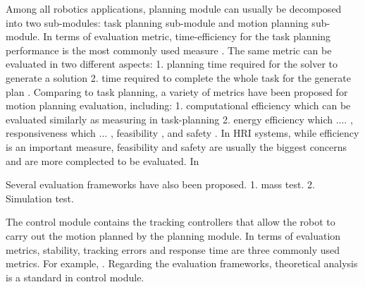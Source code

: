  Among all robotics applications, planning module can usually be decomposed into two sub-modules: task planning sub-module and motion planning sub-module. In terms of evaluation metric, time-efficiency for the task planning performance is the most commonly used measure \cite{foster1999influence,edan1991near,galindo2004improving}.  The same metric can be evaluated in two different aspects: 1. planning time required for the solver to generate a solution \cite{galindo2004improving} 2. time required to complete the whole task for the generate plan \cite{edan1991near}. Comparing to task planning, a variety of metrics have been proposed for motion planning evaluation, including: 1. computational efficiency \cite{buckley1989fast} which can be evaluated similarly as measuring in task-planning 2. energy efficiency \cite{mei2004energy} which .... , responsiveness \cite{ratliff2009chomp} which ... , feasibility \cite{cowlagi2012hierarchical}, and safety \cite{frazzoli2002real}. In HRI systems, while efficiency is an important measure, feasibility and safety are usually the biggest concerns and are more complected to be evaluated.  In \cite{cowlagi2012hierarchical} 

Several evaluation frameworks have also been proposed. 1. mass test. 2. Simulation test. 

\begin{comment}
Researches also proposed that in order to further increase efficiency, task-planning and motion planning should be done together. In \cite{garrett2015ffrob,mahmoudzadeh2016toward}, by incorporating the constraints from geometry and kinematics, these hybrid methods guarantees successful completion of task plans. The previous evaluation methods are applicable in these hybrid methods as well.  
(reason for deleting: not very related)
\end{comment}

 The control module contains the tracking controllers that allow the robot to carry out the motion planned by the planning module. In terms of evaluation metrics, stability, tracking errors and response time are three commonly used metrics. For example, . Regarding the evaluation frameworks, theoretical analysis is a standard in control module. 

\begin{comment}
In \cite{kanjanawanishkul2009path, falcone2007predictive}, Model Predictive Control (MPC) is used for tracking purpose. As a result of a properly formulated MPC problem, the controllers are guaranteed to bring the tracking error to zero theoretically. Other commonly seen control methods that require empirical parameter-tuning are proposed \cite{kanayama1990stable, xian2004, niu2013barrier}. Stability of these control rules are proved through the use of a Liapunov function. Aside from theoretical guarantees, the performance of these control modules can also be evaluated by simply recording the tracking error.
\end{comment}


